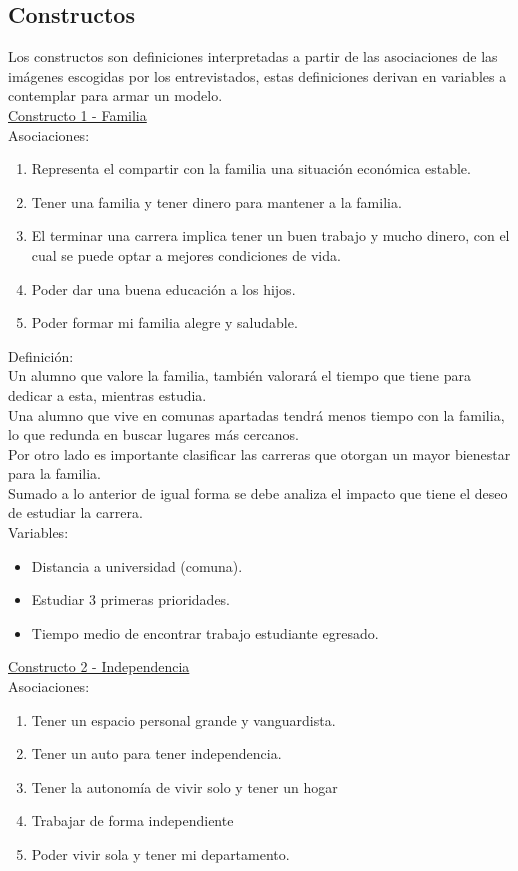 \subsection{Constructos}

Los constructos son definiciones interpretadas a partir de las asociaciones de las imágenes escogidas por los entrevistados, estas definiciones derivan en variables a contemplar para armar un modelo.\\ 


\underline {Constructo 1 - Familia} \\
Asociaciones:
\begin{enumerate}
	\item Representa el compartir con la familia una situación económica estable.
	\item Tener una familia y tener dinero para mantener a la familia.
	\item El terminar una carrera implica tener un buen trabajo y mucho dinero, con el cual se puede optar a mejores condiciones de vida.
	\item Poder dar una buena educación a los hijos.
	\item Poder formar mi familia alegre y saludable.	
\end{enumerate}

Definición:\\
Un alumno que valore la familia, también valorará el tiempo que tiene para dedicar a esta, mientras estudia.\\
Una alumno que vive en comunas apartadas tendrá menos tiempo con la familia, lo que redunda en buscar lugares más cercanos.\\
Por otro lado es importante clasificar las carreras que otorgan un mayor bienestar para la familia.\\
Sumado a lo anterior de igual forma se debe analiza el impacto que tiene el deseo de estudiar la carrera.\\

Variables:
\begin{itemize}
	\item Distancia a universidad (comuna).
	\item Estudiar 3 primeras prioridades.
	\item Tiempo medio de encontrar trabajo estudiante egresado.
\end{itemize}


\underline {Constructo 2 - Independencia} \\
Asociaciones:
\begin{enumerate}
	\item Tener un espacio personal grande y vanguardista.
	\item Tener un auto para tener independencia.
	\item Tener la autonomía de vivir solo y tener un hogar
	\item Trabajar de forma independiente
	\item Poder vivir sola y tener mi departamento.	
\end{enumerate}

